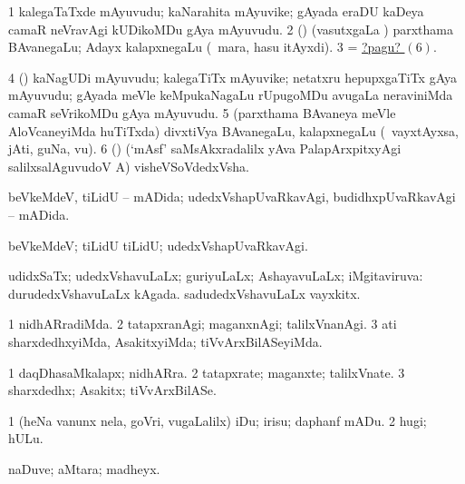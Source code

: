 \noindent 
\gl{\pagu}
\bmng
\bnum
\num{1}  kalegaTaTxde mAyuvudu; kaNarahita mAyuvike; gAyada eraDU kaDeya camaR neVravAgi kUDikoMDu gAya mAyuvudu. 
\num{2}  (\takaR) (vasutxgaLa \vi) parxthama BAvanegaLu; Adayx kalapxnegaLu (\udA\ mara, hasu itAyxdi). 
\num{3}  = \hyperlink{intention pagu6}{?pagu? \((6)\)}. 
\num{4}  (\veYshA) kaNagUDi mAyuvudu; kalegaTiTx mAyuvike; netatxru hepupxgaTiTx gAya mAyuvudu; gAyada meVle keMpukaNagaLu rUpugoMDu avugaLa neraviniMda camaR seVrikoMDu gAya mAyuvudu. 
\num{5}  (parxthama BAvaneya meVle AloVcaneyiMda huTiTxda) divxtiVya BAvanegaLu, kalapxnegaLu (\udA\ vayxtAyxsa, jAti, guNa, \mo vu). 
\hypertarget{intention pagu6}{} 
\num{6}  (\deVva) (`mAsf' saMsAkxradalilx yAva PalapArxpitxyAgi salilxsalAguvudoV A) visheVSoVdedxVsha. 
\enum
\emng
\eentry

\bentry
{}
\gl{\gu}
\bmng
beVkeMdeV, tiLidU -- mADida; udedxVshapUvaRkavAgi, budidhxpUvaRkavAgi -- mADida. 
\emng
\eentry

\bentry
{}
\gl{\kirxvi}
\bmng
beVkeMdeV; tiLidU tiLidU; udedxVshapUvaRkavAgi. 
\emng
\eentry


\bentry
{}
\gl{\gu}
\bmng
udidxSaTx; udedxVshavuLaLx; guriyuLaLx; AshayavuLaLx; iMgitaviruva:  durudedxVshavuLaLx kAgada.  sadudedxVshavuLaLx vayxkitx. 
\emng
\eentry

\bentry
{}
\gl{\kirxvi}
\bmng
\bnum
\num{1} nidhARradiMda. 
\num{2} tatapxranAgi; maganxnAgi; talilxVnanAgi. 
\num{3} ati sharxdedhxyiMda, AsakitxyiMda; tiVvArxBilASeyiMda. 
\enum
\emng
\eentry

\bentry
{}
\gl{\nA}
\bmng
\bnum
\num{1} daqDhasaMkalapx; nidhARra. 
\num{2} tatapxrate; maganxte; talilxVnate. 
\num{3} sharxdedhx; Asakitx; tiVvArxBilASe. 
\enum
\emng
\eentry

\bentry
{}
\gl{\sakirx}
\bmng
\bnum
\num{1} (heNa \mo vanunx nela, goVri, \mo vugaLalilx) iDu; irisu; daphanf mADu. 
\num{2} hugi; hULu. 
\enum
\emng
\eentry

\bentry
{}
\gl{\upa}
\expl{\Latin}
\bmng
naDuve; aMtara; madheyx. 
\emng
\eentry

